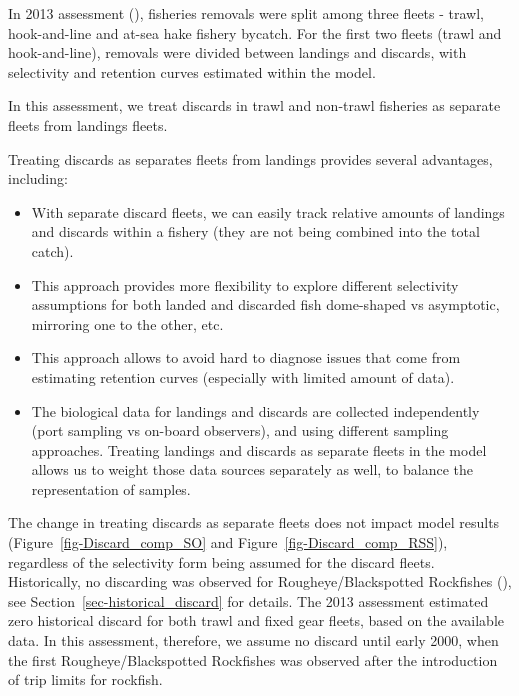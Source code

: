 \documentclass[
]{scrartcl}
\providecommand{\tightlist}{%
  \setlength{\itemsep}{0pt}\setlength{\parskip}{0pt}}\usepackage{longtable,booktabs,array}
\begin{document}
In 2013 assessment (), fisheries removals were split among three fleets - trawl,
hook-and-line and at-sea hake fishery bycatch. For the first two fleets
(trawl and hook-and-line), removals were divided between landings and
discards, with selectivity and retention curves estimated within the
model.

In this assessment, we treat discards in trawl and non-trawl fisheries
as separate fleets from landings fleets.

Treating discards as separates fleets from landings provides several
advantages, including:

\begin{itemize}
\tightlist
\item
  With separate discard fleets, we can easily track relative amounts of
  landings and discards within a fishery (they are not being combined
  into the total catch).
\item
  This approach provides more flexibility to explore different
  selectivity assumptions for both landed and discarded fish dome-shaped
  vs asymptotic, mirroring one to the other, etc.
\item
  This approach allows to avoid hard to diagnose issues that come from
  estimating retention curves (especially with limited amount of data).
\item
  The biological data for landings and discards are collected
  independently (port sampling vs on-board observers), and using
  different sampling approaches. Treating landings and discards as
  separate fleets in the model allows us to weight those data sources
  separately as well, to balance the representation of samples.
\end{itemize}

The change in treating discards as separate fleets does not impact model
results (Figure~\ref{fig-Discard_comp_SO} and
Figure~\ref{fig-Discard_comp_RSS}), regardless of the selectivity form
being assumed for the discard fleets. Historically, no discarding was
observed for Rougheye/Blackspotted Rockfishes
(), see Section~\ref{sec-historical_discard} for details. The 2013
assessment estimated zero historical discard for both trawl and fixed
gear fleets, based on the available data. In this assessment, therefore,
we assume no discard until early 2000, when the first
Rougheye/Blackspotted Rockfishes was observed after the introduction of
trip limits for rockfish.
\end{document}
